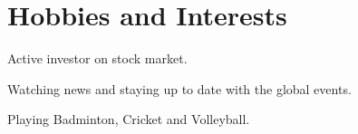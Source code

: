 \documentclass[]{resume-openfont}
\newcommand{\resumeHeading}[4]{\runsubsection{\uppercase{#1}}\descript{ | #2}\hfill\location{#3 | #4}\fakeNewLine}
\begin{document}
 \section{Hobbies and Interests}
\begin{tightemize}
    \item Active investor on stock market.
    \item Watching news and staying up to date with the global events.
    \item Playing Badminton, Cricket and Volleyball.
\end{tightemize}
\sectionsep
    
\end{document}

